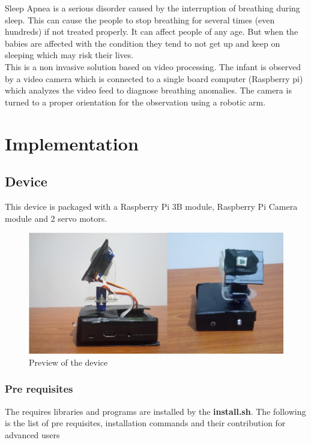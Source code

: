 \documentclass{report}
\begin{document}
Sleep Apnea is a serious disorder caused by the interruption of breathing during sleep. This can cause the people to stop breathing for several times (even hundreds) if not treated properly. It can affect people of any age. But when the babies are affected with the condition they tend to not get up and keep on sleeping which may risk their lives.\\This is a non invasive solution based on video processing. The infant is observed by a video camera which is connected to a single board computer (Raspberry pi) which analyzes the video feed to diagnose breathing anomalies. The camera is turned to a proper orientation for the observation using a robotic arm.\\


\chapter{Implementation}

\section{Device}

This device is packaged with a Raspberry Pi 3B module, Raspberry Pi Camera module and 2 servo motors. 

\begin{figure}[H]
    \centering
    \includegraphics[scale=0.4]{device.jpg}
    \caption{Preview of the device}
    \label{fig:Preview of the final product}
\end{figure}

\subsection{Pre requisites}
The requires libraries and programs are installed by the \textbf{install.sh}. The following is the list of pre requisites, installation commands and their contribution for advanced users
\end{document}

